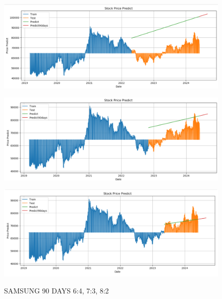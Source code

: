 \documentclass{article}
\begin{document}
\begin{multicols}{2}
\begin{figure}[H]
    \centering
    \begin{minipage}{0.15\textwidth}
    \centering
    \includegraphics[width=1\textwidth]{Image/Linear/Linear_SAMSUNG_6_4_90DAYS.png}
   
    \label{fig:1}
    \end{minipage}%
    \begin{minipage}{0.15\textwidth}
    \centering
    \includegraphics[width=1\textwidth]{Image/Linear/Linear_SAMSUNG_7_3_90DAYS.png}
  
    \label{fig:2}
    \end{minipage}%
    \begin{minipage}{0.15\textwidth}
    \centering
    \includegraphics[width=1\textwidth]{Image/Linear/Linear_SAMSUNG_8_2_90DAYS.png}

    \label{fig:3}
    \end{minipage}
    \caption{SAMSUNG 90 DAYS  6:4, 7:3, 8:2 }
\end{figure}
 


\end{multicols}
\end{document}
